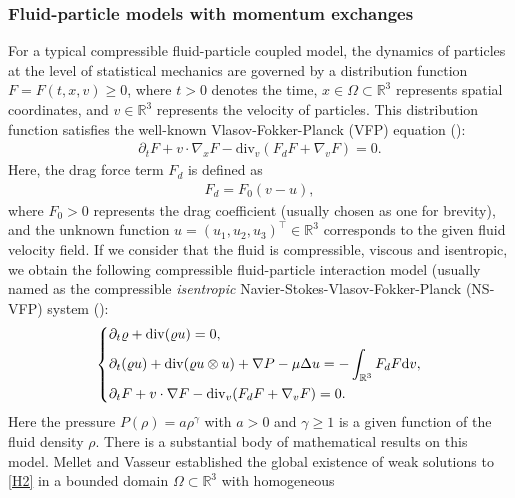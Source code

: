 \documentclass[reqno,11pt]{amsart}
\theoremstyle{plain}
\numberwithin{equation}{section}
\begin{document}
\subsubsection{Fluid-particle models with momentum exchanges}
For a typical  compressible fluid-particle coupled model,  the  dynamics of particles at
 the level of statistical mechanics are governed by a  distribution function $F=F(t,x,v) \geq 0$,
  where $t > 0$ denotes the time, $x \in \Omega \subset \mathbb{R}^3$ represents spatial coordinates, 
  and $v \in \mathbb{R}^3$ represents the  velocity of particles. This distribution function satisfies 
  the well-known Vlasov-Fokker-Planck (VFP) equation (\cite{CG-2006,MV-MMMAS-2007}): 
\begin{align}  \label{C1}
\partial_{t}F + v \cdot \nabla_x  F - \mathrm{div}_v (F_d F + \nabla_v F) = 0.
\end{align}
Here, the drag force term $F_d$ is defined as
\begin{align}\nonumber%
F_d = F_0 (v-u  ),
\end{align}
where $F_0 > 0$ represents the drag coefficient (usually  chosen as one for brevity), 
and the unknown function $u = (u_1, u_2, u_3)^{\top} \in \mathbb{R}^3$ corresponds to 
the given fluid velocity field.
If we consider  {that} the fluid is    compressible,    viscous and isentropic,  
we obtain the following   compressible 
  fluid-particle interaction model (usually named as  the  compressible \emph{isentropic} 
  Navier-Stokes-Vlasov-Fokker-Planck (NS-VFP) system (\cite{CG-2006,CKL-JHDE-2013,MV-MMMAS-2007,MV-CMP-2008}):  
    \begin{equation}\label{H2}
\left\{\begin{aligned}
&\partial_t \varrho+{\rm div}(\varrho u)=0,\\
&\partial_{t}(\varrho u)+\mathrm{div}(\varrho u\otimes u)+\nabla P-\mu\Delta u %
=-\int_{\mathbb{R}^{3}}F_d F {\rm d}v,\\
&\partial_{t}F+v\cdot\nabla F-\mathrm{div}_{v}(F_d F+\nabla_{v}F)=0. 
 \end{aligned} 
 \right.
\end{equation} 
Here the pressure  $P(\rho)=a \rho^\gamma$ with $a>0 $ and $ \gamma \geq 1$ is a given 
function of the fluid density $\rho$.
There  is  a  substantial body of mathematical results  on this model. 
Mellet and Vasseur \cite{MV-MMMAS-2007} established  the  global existence of weak 
solutions to \eqref{H2} in a bounded domain $\Omega \subset \mathbb{R}^3$ with homogeneous 
\end{document}
